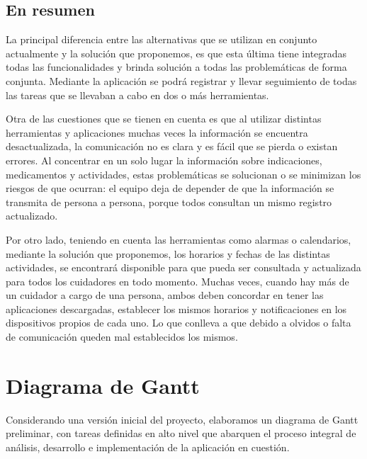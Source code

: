 \documentclass[a4paper,12pt]{article}
\begin{document}
    \subsection{En resumen}
    \par La principal diferencia entre las alternativas que se utilizan en conjunto actualmente y la solución que proponemos, es que esta última tiene integradas todas las funcionalidades y brinda solución a todas las problemáticas de forma conjunta. Mediante la aplicación se podrá registrar y llevar seguimiento de todas las tareas que se llevaban a cabo en dos o más herramientas.
    \par Otra de las cuestiones que se tienen en cuenta es que al utilizar distintas herramientas y aplicaciones muchas veces la información se encuentra desactualizada, la comunicación no es clara y es fácil que se pierda o existan errores. Al concentrar en un solo lugar la información sobre indicaciones, medicamentos y actividades, estas problemáticas se solucionan o se minimizan los riesgos de que ocurran: el equipo deja de depender de que la información se transmita de persona a persona, porque todos consultan un mismo registro actualizado.
    \par Por otro lado, teniendo en cuenta las herramientas como alarmas o calendarios, mediante la solución que proponemos, los horarios y fechas de las distintas actividades, se encontrará disponible para que pueda ser consultada y actualizada para todos los cuidadores en todo momento. Muchas veces, cuando hay más de un cuidador a cargo de una persona, ambos deben concordar en tener las aplicaciones descargadas, establecer los mismos horarios y notificaciones en los dispositivos propios de cada uno. Lo que conlleva a que debido a olvidos o falta de comunicación queden mal establecidos los mismos.

    \newpage

    \section{Diagrama de Gantt}
    \par Considerando una versión inicial del proyecto, elaboramos un diagrama de Gantt preliminar, con tareas definidas en alto nivel que abarquen el proceso integral de análisis, desarrollo e implementación de la aplicación en cuestión.
\end{document}
